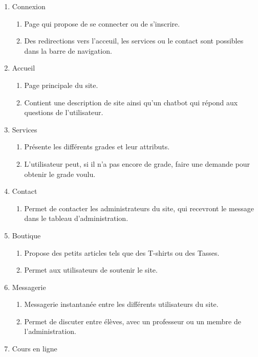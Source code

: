 \documentclass[12pt,a4paper]{article}
\begin{document}
\begin{enumerate}
    \item Connexion
    \begin{enumerate}
        \item Page qui propose de se connecter ou de s'inscrire.
        \item Des redirections vers l'acceuil, les services ou le contact sont possibles dans la barre de navigation.
    \end{enumerate}
    \item Accueil
    \begin{enumerate}
        \item Page principale du site.
        \item Contient une description de site ainsi qu'un chatbot qui répond aux questions de l'utilisateur.
    \end{enumerate}
    \item Services
    \begin{enumerate}
        \item Présente les différents grades et leur attributs.
        \item L'utilisateur peut, si il n'a pas encore de grade, faire une demande pour obtenir le grade voulu.
    \end{enumerate}
    \item Contact
    \begin{enumerate}
        \item Permet de contacter les administrateurs du site, qui recevront le message dans le tableau d'administration.
    \end{enumerate}
    \item Boutique
    \begin{enumerate}
        \item Propose des petits articles tels que des T-shirts ou des Tasses.
        \item Permet aux utilisateurs de soutenir le site.
    \end{enumerate}
    \item Messagerie
    \begin{enumerate}
        \item Messagerie instantanée entre les différents utilisateurs du site.
        \item Permet de discuter entre élèves, avec un professeur ou un membre de l'administration.
    \end{enumerate}
    \item Cours en ligne
    \begin{enumerate}

\end{enumerate}
\end{enumerate}
\end{document}
